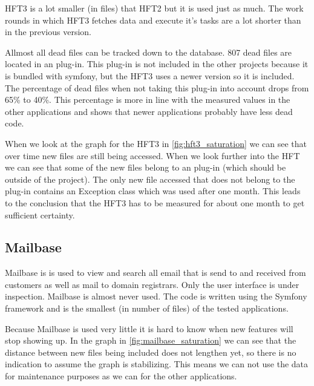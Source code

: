 HFT3 is a lot smaller (in files) that HFT2 but it is used just as much. The work rounds in which HFT3 fetches data and execute it's tasks are  a lot shorter than in the previous version. 

Allmost all dead files can be tracked down to the database. 807 dead files are located in an \orm plug-in. This plug-in is not included in the other projects because it is bundled with symfony, but the HFT3 uses a newer version so it is included. The percentage of dead files when not taking this plug-in into account drops from  65\% to 40\%. This percentage is more in line with the measured values in the other applications and shows that newer applications probably have less dead code.

When we look at the graph for the HFT3 in \autoref{fig:hft3_saturation} we can see that over time new files are still being accessed. When we look further into the HFT we can see that some of the new files belong to an \orm plug-in (which should be outside of the project). The only new file accessed that does not belong to the \orm plug-in contains an Exception class which was used after one month. This leads to the conclusion that the HFT3 has to be measured for about one month to get sufficient certainty.

\subsection*{Mailbase}

Mailbase is is used to view and search all email that is send to and received from customers as well as  mail to domain registrars. Only the user interface is under inspection. Mailbase is almost never used. The code is written using the Symfony framework and is the smallest (in number of files) of the tested applications. 


Because Mailbase is used very little it is hard to know when new features will stop showing up. In the graph in \autoref{fig:mailbase_saturation} we can see that the distance between new files being included does not lengthen yet, so there is no indication to assume the graph is stabilizing. This means we can not use the data for maintenance purposes as we can for the other applications.

